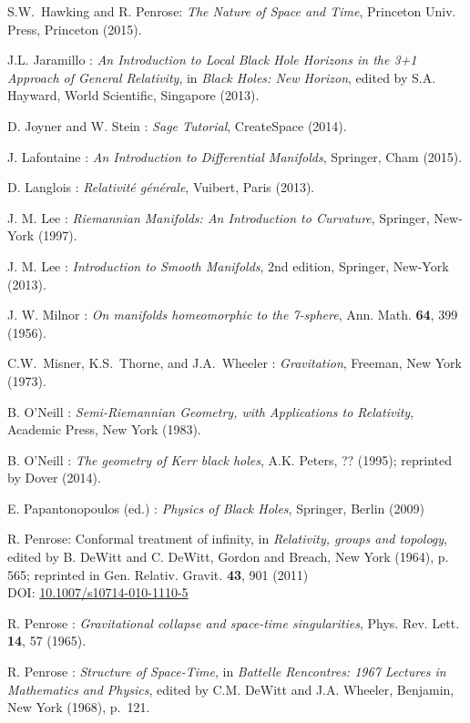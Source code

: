\begin{thebibliography}{123}
S.W.~Hawking and R. Penrose: {\em The Nature of Space and Time},
Princeton Univ. Press, Princeton (2015).

J.L. Jaramillo : {\em An Introduction to Local Black Hole Horizons in the 3+1
Approach of General Relativity}, in {\em Black Holes: New Horizon}, edited
by S.A. Hayward, World Scientific, Singapore (2013).

D. Joyner and W. Stein : {\em Sage Tutorial}, CreateSpace (2014).

J. Lafontaine : {\em An Introduction to Differential Manifolds},
Springer, Cham (2015).

D. Langlois : \emph{Relativit\'e g\'en\'erale},
Vuibert, Paris (2013).

J. M. Lee : {\em Riemannian Manifolds: An Introduction to Curvature},
Springer, New-York (1997).

J. M. Lee : {\em Introduction to Smooth Manifolds}, 2nd edition,
Springer, New-York (2013).

J. W. Milnor : {\em On manifolds homeomorphic to the 7-sphere},
Ann. Math. {\bf 64}, 399 (1956).

C.W.~Misner, K.S.~Thorne, and J.A.~Wheeler : {\em Gravitation},
Freeman, New York (1973).

B. O'Neill : {\em Semi-Riemannian Geometry, with Applications to Relativity},
Academic Press, New York (1983).

B. O'Neill : {\em The geometry of Kerr black holes}, A.K. Peters, ?? (1995);
reprinted by Dover (2014).

E. Papantonopoulos (ed.) : {\em Physics of Black Holes}, Springer, Berlin (2009)

R. Penrose: {Conformal treatment of infinity}, in {\em Relativity, groups and topology},
edited by B. DeWitt and C. DeWitt,
Gordon and Breach, New York (1964), p. 565; reprinted in
Gen. Relativ. Gravit. {\bf 43}, 901 (2011)\\
DOI: \href{http://dx.doi.org/doi:10.1007/s10714-010-1110-5}{10.1007/s10714-010-1110-5}

R. Penrose : {\em Gravitational collapse and space-time singularities},
Phys. Rev. Lett. {\bf 14}, 57 (1965).

R. Penrose : {\em Structure of Space-Time},
in {\em Battelle Rencontres: 1967 Lectures in Mathematics and Physics},
edited by C.M. DeWitt and J.A. Wheeler,
Benjamin, New York (1968), p.~121.


\end{thebibliography}
